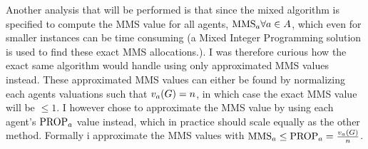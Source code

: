 Another analysis that will be performed is that since the mixed algorithm is specified to compute the MMS value for all agents, $\text{MMS}_a\forall a\in A$, which even for smaller instances can be time consuming (a Mixed Integer Programming solution is used to find these exact MMS allocations.). I was therefore curious how the exact same algorithm would handle using only approximated MMS values instead. These approximated MMS values can either be found by normalizing each agents valuations such that $v_a(G)=n$, in which case the exact MMS value will be $\leq1$. I however chose to approximate the MMS value by using each agent's $\text{PROP}_a$ value instead, which in practice should scale equally as the other method. Formally i approximate the MMS values with $\text{MMS}_a\leq\text{PROP}_a=\frac{v_a(G)}{n}$.

